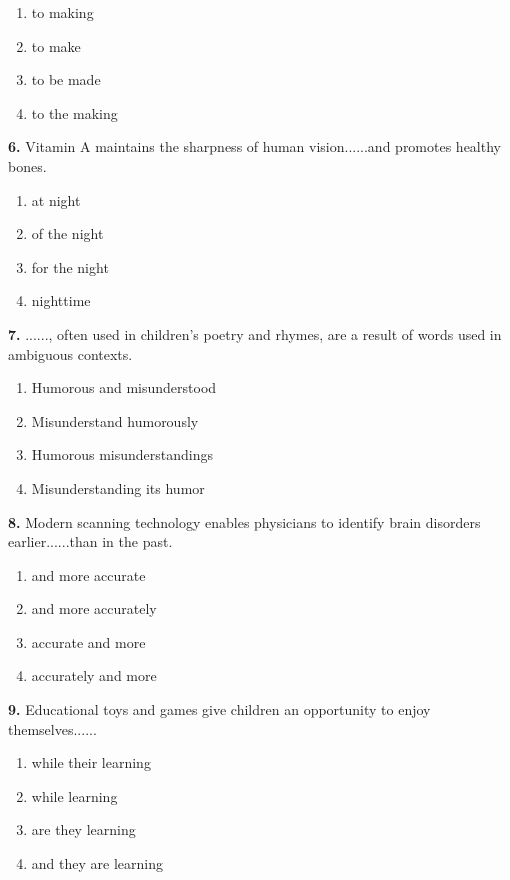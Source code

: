 \documentclass[12pt]{article}
\begin{document}
\begin{enumerate}[label=(\Alph*),leftmargin=*,itemsep=0.2em]
\item to making
\item to make
\item to be made
\item to the making
\end{enumerate}
\par
\vspace{0.25\baselineskip}
\noindent\textbf{6.} Vitamin A maintains the sharpness of human vision......and promotes healthy bones.
\begin{enumerate}[label=(\Alph*),leftmargin=*,itemsep=0.2em]
\item at night
\item of the night
\item for the night
\item nighttime
\end{enumerate}
\par
\vspace{0.25\baselineskip}
\noindent\textbf{7.} ......, often used in children's poetry and rhymes, are a result of words used in ambiguous contexts.
\begin{enumerate}[label=(\Alph*),leftmargin=*,itemsep=0.2em]
\item Humorous and misunderstood
\item Misunderstand humorously
\item Humorous misunderstandings
\item Misunderstanding its humor
\end{enumerate}
\par
\vspace{0.25\baselineskip}
\noindent\textbf{8.} Modern scanning technology enables physicians to identify brain disorders earlier......than in the past.
\begin{enumerate}[label=(\Alph*),leftmargin=*,itemsep=0.2em]
\item and more accurate
\item and more accurately
\item accurate and more
\item accurately and more
\end{enumerate}
\par
\vspace{0.25\baselineskip}
\noindent\textbf{9.} Educational toys and games give children an opportunity to enjoy themselves......
\begin{enumerate}[label=(\Alph*),leftmargin=*,itemsep=0.2em]
\item while their learning
\item while learning
\item are they learning
\item and they are learning
\end{enumerate}
\end{document}
